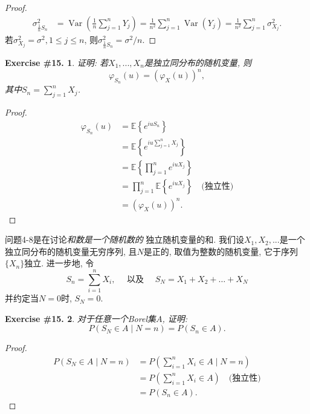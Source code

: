 \documentclass[UTF8, a4paper]{article}
\newtheorem{exercise}{Exercise \#15.}
\begin{document}
\begin{proof}
\begin{align*}
    \sigma_{\frac{1}{n} S_n}^2 &= \operatorname{Var}\left(\frac{1}{n} \sum_{j=1}^{n} Y_j\right) = \frac{1}{n^2} \sum_{j=1}^{n} \operatorname{Var}(Y_j) = \frac{1}{n^2} \sum_{j=1}^{n} \sigma_{X_j}^2.
\end{align*}
若\(\sigma_{X_j}^2 = \sigma^2, 1 \leq j \leq n\), 则\(\sigma_{\frac{1}{n} S_n}^2 = \sigma^2/n\).
\end{proof}


\begin{framed}
\begin{exercise}
证明: 若\(X_1, ..., X_n\)是独立同分布的随机变量, 则
$$
\varphi_{S_n}(u)=\left(\varphi_X(u)\right)^n,
$$
其中\(S_n = \sum_{j=1}^{n}X_j\).
\end{exercise}
\end{framed}

\begin{proof}
\begin{align*}
    \varphi_{S_n}(u) &= \mathbb{E}\left\{e^{i u S_n}\right\} \\
    &= \mathbb{E}\left\{e^{i u \sum_{j=1}^{n}X_j}\right\} \\
    &= \mathbb{E}\left\{\prod_{j=1}^{n}e^{i u X_j}\right\} \\
    &= \prod_{j=1}^{n}\mathbb{E}\left\{e^{i u X_j}\right\} \quad \text{(独立性)}\\
    &= \left(\varphi_X(u)\right)^n.
\end{align*}
\end{proof}


问题4-8是在讨论{\it 和数是一个随机数的} 独立随机变量的和.
我们设\(X_1, X_2, ...\)是一个独立同分布的随机变量无穷序列, 且\(N\)是正的, 取值为整数的随机变量, 它于序列\(\{X_n\}\)独立. 进一步地, 令
$$
S_n=\sum_{i=1}^n X_i, \quad \text { 以及 } \quad S_N=X_1+X_2+\ldots+X_N
$$
并约定当\(N = 0\)时, \(S_N = 0\).

\begin{framed}
\begin{exercise}
对于任意一个Borel集\(A\), 证明: 
$$
P\left(S_N \in A \mid N=n\right)=P\left(S_n \in A\right) .
$$
\end{exercise}
\end{framed}

\begin{proof}
\begin{align*}
    P\left(S_N \in A \mid N=n\right) &= P\left(\sum_{i=1}^{n}X_i \in A \mid N=n\right) \\
    &= P\left(\sum_{i=1}^{n}X_i \in A\right) \quad \text{(独立性)}\\
    &= P\left(S_n \in A\right).
\end{align*}
\end{proof}
\end{document}
